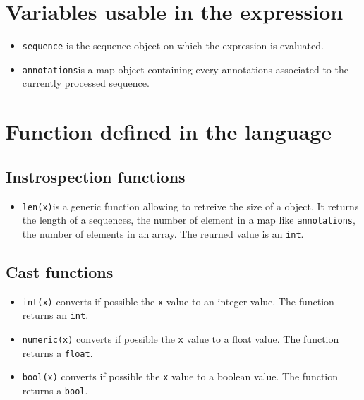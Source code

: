 \documentclass[
  letterpaper,
  DIV=11,
  numbers=noendperiod]{scrreprt}
\providecommand{\tightlist}{%
  \setlength{\itemsep}{0pt}\setlength{\parskip}{0pt}}\usepackage{longtable,booktabs,array}
\begin{document}
\hypertarget{variables-usable-in-the-expression}{%
\section{Variables usable in the
expression}\label{variables-usable-in-the-expression}}

\begin{itemize}
\tightlist
\item
  \texttt{sequence} is the sequence object on which the expression is
  evaluated.
\item
  \texttt{annotations}is a map object containing every annotations
  associated to the currently processed sequence.
\end{itemize}

\hypertarget{function-defined-in-the-language}{%
\section{Function defined in the
language}\label{function-defined-in-the-language}}

\hypertarget{instrospection-functions}{%
\subsection*{Instrospection functions}\label{instrospection-functions}}

\begin{itemize}
\tightlist
\item
  \texttt{len(x)}is a generic function allowing to retreive the size of
  a object. It returns the length of a sequences, the number of element
  in a map like \texttt{annotations}, the number of elements in an
  array. The reurned value is an \texttt{int}.
\end{itemize}

\hypertarget{cast-functions}{%
\subsection*{Cast functions}\label{cast-functions}}

\begin{itemize}
\tightlist
\item
  \texttt{int(x)} converts if possible the \texttt{x} value to an
  integer value. The function returns an \texttt{int}.
\item
  \texttt{numeric(x)} converts if possible the \texttt{x} value to a
  float value. The function returns a \texttt{float}.
\item
  \texttt{bool(x)} converts if possible the \texttt{x} value to a
  boolean value. The function returns a \texttt{bool}.
\end{itemize}
\end{document}
